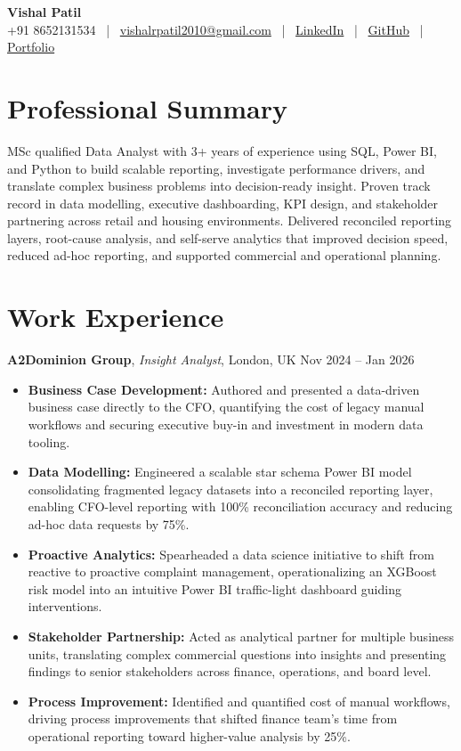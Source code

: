 \documentclass[10pt, a4paper]{article}
\begin{document}
\begin{center}
    {\LARGE \textbf{Vishal Patil}} \\[2pt]
    +91 8652131534 \, | \, \href{mailto:vishalrpatil2010@gmail.com}{vishalrpatil2010@gmail.com} \, | \, \href{https://www.linkedin.com/in/vishalrpatill/}{LinkedIn} \, | \, \href{https://github.com/VishalP44}{GitHub} \, | \, \href{https://vishalp44.github.io/Vishal\_Patil\_Portfolio/\#contact}{Portfolio}
\end{center}

\section*{Professional Summary}
MSc qualified Data Analyst with 3+ years of experience using SQL, Power BI, and Python to build scalable reporting, investigate performance drivers, and translate complex business problems into decision-ready insight. Proven track record in data modelling, executive dashboarding, KPI design, and stakeholder partnering across retail and housing environments. Delivered reconciled reporting layers, root-cause analysis, and self-serve analytics that improved decision speed, reduced ad-hoc reporting, and supported commercial and operational planning.

\section*{Work Experience}

\textbf{A2Dominion Group}, \textit{Insight Analyst}, London, UK \hfill Nov 2024 -- Jan 2026
\begin{itemize}
    \item \textbf{Business Case Development:} Authored and presented a data-driven business case directly to the CFO, quantifying the cost of legacy manual workflows and securing executive buy-in and investment in modern data tooling.
    \item \textbf{Data Modelling:} Engineered a scalable star schema Power BI model consolidating fragmented legacy datasets into a reconciled reporting layer, enabling CFO-level reporting with 100\% reconciliation accuracy and reducing ad-hoc data requests by 75\%.
    \item \textbf{Proactive Analytics:} Spearheaded a data science initiative to shift from reactive to proactive complaint management, operationalizing an XGBoost risk model into an intuitive Power BI traffic-light dashboard guiding interventions.
    \item \textbf{Stakeholder Partnership:} Acted as analytical partner for multiple business units, translating complex commercial questions into insights and presenting findings to senior stakeholders across finance, operations, and board level.
    \item \textbf{Process Improvement:} Identified and quantified cost of manual workflows, driving process improvements that shifted finance team's time from operational reporting toward higher-value analysis by 25\%.
\end{itemize}
\end{document}
